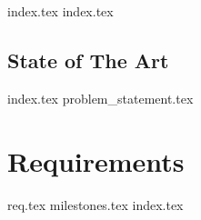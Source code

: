 {index.tex}
{index.tex}
\chapter{State of The Art}\label{cha:sota}
{index.tex}
{problem_statement.tex}
\part{Requirements}
{req.tex}
{milestones.tex}
{index.tex}